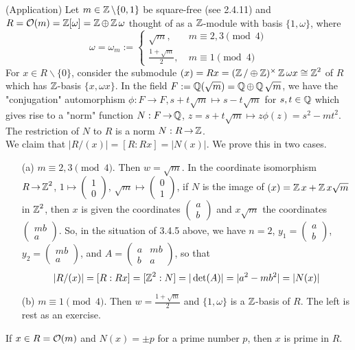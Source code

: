 \documentclass[11pt]{book}
\theoremstyle{definition}   \newtheorem{defn}[counter]{Definition} %
\newcommand{\bs}{\backslash}   \newcommand{\A}{\mathcal{A}}   \newcommand{\sy}{\textnormal{Syl}}   \newcommand{\size}[1]{\left| #1 \right|}
\newcommand{\zx}[1]{(\z/#1\z)^{\times}}   \newcommand{\zn}[1]{\z/#1\z}   \newcommand{\pr}[1]{\textbf{Problem #1.}}   \newcommand{\abc}{(\alph*)}
\newcommand{\mymatrix}[2]{\left( \begin{array}{#1} #2 \end{array} \right)}
\DeclareMathOperator{\ra}{\rightarrow}   \DeclareMathOperator{\Poly}{\mathbf{P}}   \DeclareMathOperator{\spn}{\textnormal{span}}   \DeclareMathOperator{\aut}{\textnormal{Aut}}
\newcommand{\vs}{\vspace{8pt}}
\numberwithin{counter}{chapter}
\begin{document}
\begin{remark}(Application)
Let $m \in \z \bs\{0,1\}$ be square-free (see 2.4.11) and $R = \mathcal{O}(m) = \operatorname{\mathbb{Z}}[\omega] = \operatorname{\mathbb{Z}} \oplus \operatorname{\mathbb{Z}}\omega$ thought of as a $\operatorname{\mathbb{Z}}$-module with basis $\{1,\omega\}$, where
	\[\omega = \omega_m := \begin{cases}
	\sqrt{m}, \quad & m \equiv 2,3 \pmod{4}\\
	\frac{1+\sqrt{m}}{2}, & m \equiv 1 \pmod{4}
	\end{cases} \]
For $x \in R\bs\{0\}$, consider the submodule $(x) = Rx = \zx \oplus \z \omega x \cong \z^2$ of $R$ which has $\operatorname{\mathbb{Z}}$-basis $\{x,\omega x\}$. In the field $F := \operatorname{\mathbb{Q}}(\sqrt{m}) = \operatorname{\mathbb{Q}} \oplus \operatorname{\mathbb{Q}} \sqrt{m}$, we have the "conjugation" automorphism $\phi : F \ra F, s+t \sqrt{m} \mapsto s-t\sqrt{m}$ for $s,t \in \operatorname{\mathbb{Q}}$ which gives rise to a "norm" function $N : F \ra \Q$, $z = s+t \sqrt{m} \mapsto z \phi(z) = s^2 - mt^2$. The restriction of $N$ to $R$ is a norm $N : R \ra \z$. \\

We claim that $|R/(x)| = [R : Rx] = |N(x)|$. We prove this in two cases.
\begin{enumerate}
\item[(a)] $m \equiv 2,3 \pmod{4}$. Then $w = \sqrt{m}$. In the coordinate isomorphism $R \ra \z^2$, $1 \mapsto \mymatrix{c}{1 \\ 0}$, $\sqrt{m} \mapsto \mymatrix{c}{0 \\ 1}$, if $N$ is the image of $(x) = \operatorname{\mathbb{Z}} x + \operatorname{\mathbb{Z}} x\sqrt{m}$ in $\operatorname{\mathbb{Z}}^2$, then $x$ is given the coordinates $\mymatrix{c}{a \\ b}$ and $x \sqrt{m}$ the coordinates $\mymatrix{c}{mb \\ a}$. So, in the situation of 3.4.5 above, we have $n = 2$, $y_1 = \mymatrix{c}{a \\ b}$, $y_2 = \mymatrix{c}{mb \\ a}$, and $A = \mymatrix{cc}{a & mb \\ b & a}$, so that
\[|R/(x)| = [R : Rx] = [\operatorname{\mathbb{Z}}^2 : N] = |\det(A)| = |a^2 - mb^2| = |N(x)| \]

\item[(b)] $m \equiv 1 \pmod{4}$. Then $w = \frac{1 + \sqrt{m}}{2}$ and $\{1,\omega\}$ is a $\operatorname{\mathbb{Z}}$-basis of $R$. The left is rest as an exercise.
\end{enumerate}
\end{remark}

\vs

\noindent {} If $x \in R = \mathcal{O}(m)$ and $N(x) = \pm p$ for a prime number $p$, then $x$ is prime in $R$. \\
\end{document}
